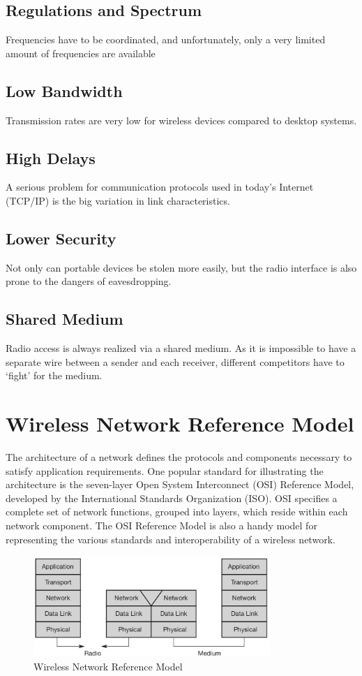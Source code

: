 \subsection{Regulations and Spectrum}
Frequencies have to be coordinated, and unfortunately, only a very limited amount of frequencies are available  

\subsection{Low Bandwidth}
Transmission rates are very low for wireless devices compared to desktop systems.

\subsection{High Delays}
A serious problem for communication protocols used in today’s Internet (TCP/IP) is the big variation in link characteristics. 

\subsection{Lower Security}
Not only can portable devices be stolen more easily, but the radio interface is also prone to the dangers of eavesdropping.

\subsection{Shared Medium}
Radio access is always realized via a shared medium. As it is impossible to have a separate wire between a sender and each receiver, different competitors have to ‘fight’ for the medium. 

\section{Wireless Network Reference Model}
The architecture of a network defines the protocols and components necessary to satisfy application requirements. One popular standard for illustrating the architecture is the
seven-layer Open System Interconnect (OSI) Reference Model, developed by the International Standards Organization (ISO). OSI specifies a complete set of network functions, grouped into layers, which reside within each network component. The OSI Reference Model is also a handy model for representing the various standards and interoperability of a wireless network.


\begin{figure}[tph]
	\centering
	\includegraphics[width=0.8\textwidth]{graphics/wireless-ref-model}
	\caption{Wireless Network Reference Model}
	\label{fig:wireless-ref-model}
\end{figure}



